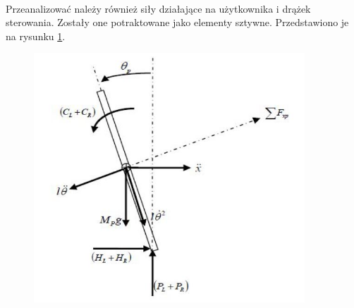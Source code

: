 \paragraph*{}
Przeanalizować należy również siły działające na użytkownika i drążek sterowania. Zostały one potraktowane jako elementy sztywne. Przedstawiono je na rysunku \ref{fig:model_raczka}.

\begin{figure}[H]
	\centering
	\includegraphics[width=4in]{Figures/model_raczka.jpg}
	\label{fig:model_raczka}
\end{figure}

